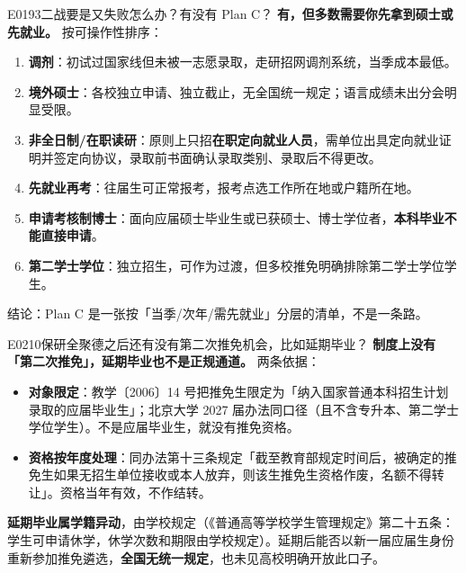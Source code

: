 \begin{qa}{E0193}{二战要是又失败怎么办？有没有 Plan C？}
\textbf{有，但多数需要你先拿到硕士或先就业。}
按可操作性排序：
\begin{enumerate}
  \item \textbf{调剂}：初试过国家线但未被一志愿录取，走研招网调剂系统，当季成本最低。
  \item \textbf{境外硕士}：各校独立申请、独立截止，无全国统一规定；语言成绩未出分会明显受限。
  \item \textbf{非全日制/在职读研}：原则上只招\textbf{在职定向就业人员}，需单位出具定向就业证明并签定向协议，录取前书面确认录取类别、录取后不得更改。
  \item \textbf{先就业再考}：往届生可正常报考，报考点选工作所在地或户籍所在地。
  \item \textbf{申请考核制博士}：面向应届硕士毕业生或已获硕士、博士学位者，\textbf{本科毕业不能直接申请}。
  \item \textbf{第二学士学位}：独立招生，可作为过渡，但多校推免明确排除第二学士学位学生。
\end{enumerate}

结论：Plan C 是一张按「当季/次年/需先就业」分层的清单，不是一条路。
\end{qa}

\begin{qa}{E0210}{保研全聚德之后还有没有第二次推免机会，比如延期毕业？}
\textbf{制度上没有「第二次推免」，延期毕业也不是正规通道。}
两条依据：
\begin{itemize}
  \item \textbf{对象限定}：教学〔2006〕14 号把推免生限定为「纳入国家普通本科招生计划录取的应届毕业生」；北京大学 2027 届办法同口径（且不含专升本、第二学士学位学生）。不是应届毕业生，就没有推免资格。
  \item \textbf{资格按年度处理}：同办法第十三条规定「截至教育部规定时间后，被确定的推免生如果无招生单位接收或本人放弃，则该生推免生资格作废，名额不得转让」。资格当年有效，不作结转。
\end{itemize}

\textbf{延期毕业属学籍异动}，由学校规定（《普通高等学校学生管理规定》第二十五条：学生可申请休学，休学次数和期限由学校规定）。延期后能否以新一届应届生身份重新参加推免遴选，\textbf{全国无统一规定}，也未见高校明确开放此口子。
\end{qa}

